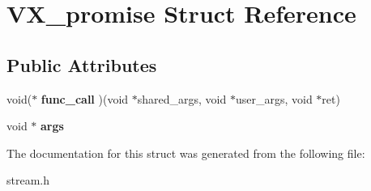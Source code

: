 \hypertarget{structVX__promise}{\section{V\-X\-\_\-promise Struct Reference}
\label{structVX__promise}
}
\subsection*{Public Attributes}
\begin{DoxyCompactItemize}
\item 
\hypertarget{structVX__promise_ab9dd20e05a2b9bee73b8072478afba3d}{void($\ast$ {\bfseries func\-\_\-call} )(void $\ast$shared\-\_\-args, void $\ast$user\-\_\-args, void $\ast$ret)}\label{structVX__promise_ab9dd20e05a2b9bee73b8072478afba3d}

\item 
\hypertarget{structVX__promise_adc7f9291d9dbb0291519601b823dcc0b}{void $\ast$ {\bfseries args}}\label{structVX__promise_adc7f9291d9dbb0291519601b823dcc0b}

\end{DoxyCompactItemize}


The documentation for this struct was generated from the following file\-:\begin{DoxyCompactItemize}
\item 
stream.\-h\end{DoxyCompactItemize}
